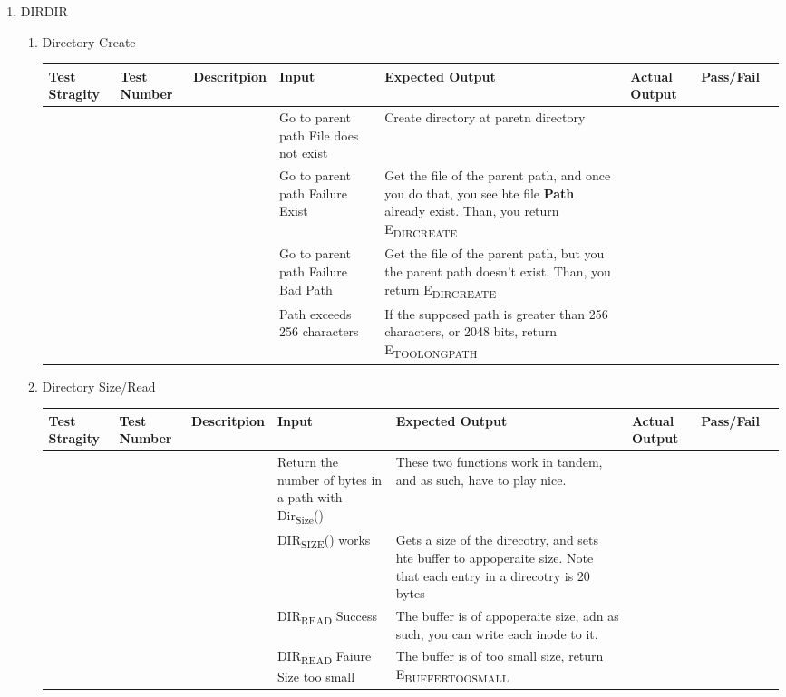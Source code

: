\documentclass{article}
\begin{document}
\begin{enumerate}
\begin{enumerate}
\item DIR\hfill{}\textsc{DIR}
\label{sec:orge408586}
\begin{enumerate}
\item Directory Create
\label{sec:org9375d1f}
\begin{center}
\begin{tabular}{llllllll}
Test Stragity & Test Number & Descritpion & Input & Expected Output & Actual Output & Pass/Fail & \\
\hline
 &  &  & Go to parent path File does not exist & Create directory at paretn directory &  &  & \\
 &  &  & Go to parent path Failure Exist & Get the file of the parent path, and once you do that, you see hte file \textbf{Path} already exist. Than, you return E\textsubscript{DIR}\textsubscript{CREATE} &  &  & \\
 &  &  & Go to parent path Failure Bad Path & Get the file of the parent path, but you the parent path doesn't exist. Than, you return E\textsubscript{DIR}\textsubscript{CREATE} &  &  & \\
 &  &  & Path exceeds 256 characters & If the supposed path is greater than 256 characters, or 2048 bits, return E\textsubscript{TOO}\textsubscript{LONG}\textsubscript{PATH} &  &  & \\
\end{tabular}
\end{center}
\item Directory Size/Read
\label{sec:org72e4d51}
\begin{center}
\begin{tabular}{llllllll}
Test Stragity & Test Number & Descritpion & Input & Expected Output & Actual Output & Pass/Fail & \\
\hline
 &  &  & Return the number of bytes in a path with Dir\textsubscript{Size}() & These two functions work in tandem, and as such, have to play nice. &  &  & \\
 &  &  & DIR\textsubscript{SIZE}() works & Gets a size of the direcotry, and sets hte buffer to appoperaite size. Note that each entry in a direcotry is 20 bytes &  &  & \\
 &  &  & DIR\textsubscript{READ} Success & The buffer is of appoperaite size, adn as such, you can write each inode to it. &  &  & \\
 &  &  & DIR\textsubscript{READ} Faiure Size too small & The buffer is of too small size, return E\textsubscript{BUFFER}\textsubscript{TOO}\textsubscript{SMALL} &  &  & \\

\end{tabular}
\end{center}
\end{enumerate}
\end{enumerate}
\end{enumerate}
\end{document}
